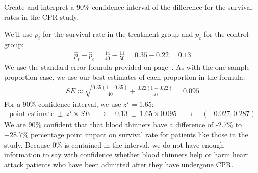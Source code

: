 \begin{examplewrap}
\begin{nexample}{
    Create and interpret a 90\% confidence interval of the
    difference for the survival rates in the CPR study.}

  We'll use $p_t$ for the survival
  rate in the treatment group and $p_c$ for the control
  group:
  \begin{align*}
  \hat{p}_{t} - \hat{p}_{c}
    = \frac{14}{40} - \frac{11}{50}
    = 0.35 - 0.22
    = 0.13
  \end{align*}
  We use the standard error formula provided on
  page~\pageref{seForDiffOfProp}.
  As with the one-sample proportion case,
  we use our best estimates of each proportion in the formula:
  \begin{align*}
  SE \approx \sqrt{\frac{0.35 (1 - 0.35)}{40} +
      \frac{0.22 (1 - 0.22)}{50}}
    = 0.095
  \end{align*}
  For a 90\% confidence interval, we use $z^{\star} = 1.65$:
  \begin{align*}
  \text{point estimate} \ \pm\ z^{\star} \times SE
    \quad \to \quad 0.13 \ \pm\ 1.65 \times  0.095
    \quad \to \quad (-0.027, 0.287)
  \end{align*}
  We are 90\% confident that that blood thinners have
  a difference of -2.7\% to +28.7\% percentage point
  impact on survival rate for patients like those in
  the study.
  Because 0\% is contained in the interval,
  we do not have enough information to say
  with confidence whether blood thinners help or harm
  heart attack patients who have been admitted after
  they have undergone CPR.
\end{nexample}
\end{examplewrap}




